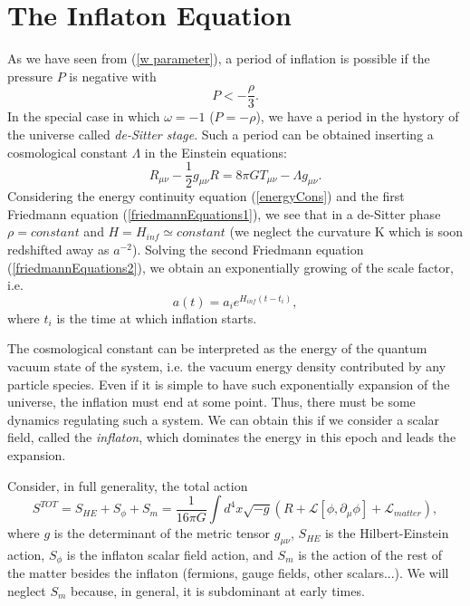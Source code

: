 \documentclass[11pt,a4paper,twoside]{book}
\begin{document}
\section{The Inflaton Equation}
As we have seen  from (\ref{w parameter}), a period of inflation is possible if the pressure $ P $ is negative with 
\begin{equation}
\label{Pressure-density}
P < -\frac{\rho}{3}.
\end{equation}
In the special case in which $ \omega = -1 $ ($P=-\rho$), we have a period in the hystory of the universe called \textit{de-Sitter stage}. 
Such a period can be obtained inserting a cosmological constant $ \Lambda $ in the Einstein equations: 
\begin{equation}
	\label{RGModified}
	R_{\mu\nu} - \frac{1}{2}g_{\mu\nu}R = 8\pi G T_{\mu\nu} - \Lambda g_{\mu\nu}.
\end{equation}
Considering the energy continuity equation (\ref{energyCons}) and the first Friedmann equation (\ref{friedmannEquations1}), we see that in a de-Sitter phase $ \rho = constant $ and $ H = H_{inf} \simeq constant $ (we neglect the curvature K which is soon redshifted away as $ a^{-2} $).
Solving the second Friedmann equation (\ref{friedmannEquations2}), we obtain an exponentially growing of the scale factor, i.e.
\begin{equation}
	\label{scaleFactorDeSitter}
	a(t)=a_{i} e^{ H_{inf}(t-t_{i})},	
\end{equation}
where $t_{i}$ is the time at which inflation starts. 

The cosmological constant can be interpreted as the energy of the quantum vacuum state of the system, i.e. the vacuum energy density contributed by any particle species. Even if it is simple to have such exponentially expansion of the universe, the inflation must end at some point. Thus, there must be some dynamics regulating such a system.
We can obtain this if we consider a scalar field, called the \textit{inflaton}, which dominates the energy in this epoch and leads the expansion.

Consider, in full generality, the total action
\begin{equation}
	\label{totalAction}
	S^{TOT} = S_{HE} + S_{\phi} + S_{m} 
		        = \frac{1}{16\pi G} \int d^{4} x \sqrt{-g} (R + \mathcal{L} [\phi , \partial_{\mu} \phi ] + \mathcal{L}_{matter}) 	,
\end{equation}
where $ g $ is the determinant of the metric tensor $ g_{\mu\nu} $, $ S_{HE} $ is the Hilbert-Einstein action, $ S_{\phi} $ is the inflaton scalar field action, and $ S_{m} $ is the action of the rest of the matter besides the inflaton (fermions, gauge fields, other scalars...). We will neglect $ S_{m} $ because, in general, it is subdominant at early times. 
\end{document}
